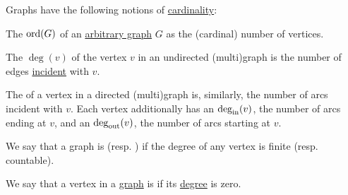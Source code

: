 \begin{definition}\label{def:graph_cardinality}
  Graphs have the following notions of \hyperref[def:cardinal]{cardinality}:
  \begin{thmenum}
     The  \( \operatorname{ord}(G) \) of an \hyperref[rem:arbitrary_graph]{arbitrary graph} \( G \) as the (cardinal) number of vertices.

    \medskip

     The  \( \deg(v) \) of the vertex \( v \) in an undirected (multi)graph is the number of edges \hyperref[def:graph_incidence]{incident} with \( v \).

     The  of a vertex in a directed (multi)graph is, similarly, the number of arcs incident with \( v \). Each vertex additionally has an  \( \deg_{\operatorname{in}}(v) \), the number of arcs ending at \( v \), and an  \( \deg_{\operatorname{out}}(v) \), the number of arcs starting at \( v \).

     We say that a graph is  (resp. ) if the degree of any vertex is finite (resp. countable).
  \end{thmenum}
\end{definition}

\begin{definition}\label{def:isolated_vertex}
  We say that a vertex in a \hyperref[rem:arbitrary_graph]{graph} is  if its \hyperref[def:graph_cardinality/directed_degree]{degree} is zero.
\end{definition}

